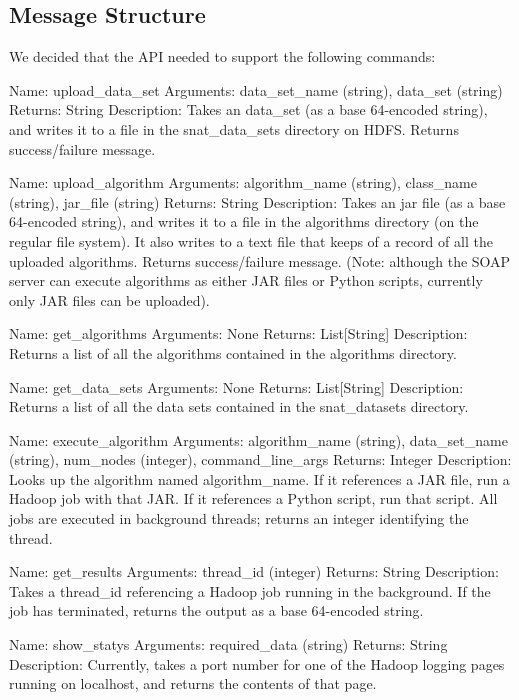 \subsection{Message Structure}

We decided that the API needed to support the following commands:

Name: upload\_data\_set
Arguments: data\_set\_name (string), data\_set (string)
Returns: String
Description: Takes an data\_set (as a base 64-encoded string), and writes it to a file in the snat\_data\_sets directory on HDFS. Returns success/failure message.

Name: upload\_algorithm
Arguments: algorithm\_name (string), class\_name (string), jar\_file (string)
Returns: String
Description: Takes an jar file (as a base 64-encoded string), and writes it to a file in the algorithms directory (on the regular file system). It also writes to a text file that keeps of a record of all the uploaded algorithms. Returns success/failure message. (Note: although the SOAP server can execute algorithms as either JAR files or Python scripts, currently only JAR files can be uploaded).

Name: get\_algorithms
Arguments: None
Returns: List[String]
Description: Returns a list of all the algorithms contained in the algorithms directory.

Name: get\_data\_sets
Arguments: None
Returns: List[String]
Description: Returns a list of all the data sets contained in the snat\_datasets directory.

Name: execute\_algorithm
Arguments: algorithm\_name (string), data\_set\_name (string), num\_nodes (integer), command\_line\_args
Returns: Integer
Description: Looks up the algorithm named algorithm\_name. If it references a JAR file, run a Hadoop job with that JAR. If it references a Python script, run that script. All jobs are executed in background threads; returns an integer identifying the thread.

Name: get\_results
Arguments: thread\_id (integer)
Returns: String
Description: Takes a thread\_id referencing a Hadoop job running in the background. If the job has terminated, returns the output as a base 64-encoded string.

Name: show\_statys
Arguments: required\_data (string)
Returns: String
Description: Currently, takes a port number for one of the Hadoop logging pages running on localhost, and returns the contents of that page.


